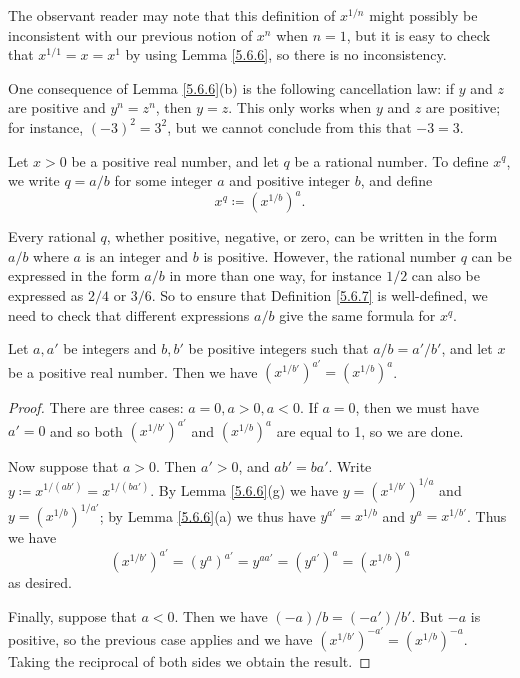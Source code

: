 \begin{note}
The observant reader may note that this definition of \(x^{1 / n}\) might possibly be inconsistent with our previous notion of \(x^n\) when \(n = 1\), but it is easy to check that \(x^{1 / 1} = x = x^1\) by using Lemma \ref{5.6.6}, so there is no inconsistency.
\end{note}

\begin{note}
One consequence of Lemma \ref{5.6.6}(b) is the following cancellation law:
if \(y\) and \(z\) are positive and \(y^n = z^n\), then \(y = z\).
This only works when \(y\) and \(z\) are positive;
for instance, \((-3)^2 = 3^2\), but we cannot conclude from this that \(-3 = 3\).
\end{note}

\begin{definition}\label{5.6.7}
Let \(x > 0\) be a positive real number, and let \(q\) be a rational number.
To define \(x^q\), we write \(q = a / b\) for some integer \(a\) and positive integer \(b\), and define
\[
    x^q \coloneqq (x^{1 / b})^a.
\]
\end{definition}

\begin{note}
Every rational \(q\), whether positive, negative, or zero, can be written in the form \(a / b\) where \(a\) is an integer and \(b\) is positive.
However, the rational number \(q\) can be expressed in the form \(a / b\) in more than one way, for instance \(1 / 2\) can also be expressed as \(2 / 4\) or \(3 / 6\).
So to ensure that Definition \ref{5.6.7} is well-defined, we need to check that different expressions \(a / b\) give the same formula for \(x^q\).
\end{note}

\begin{lemma}\label{5.6.8}
Let \(a, a'\) be integers and \(b, b'\) be positive integers such that \(a / b = a' / b'\), and let \(x\) be a positive real number.
Then we have \((x^{1 / b'})^{a'} = (x^{1 / b})^a\).
\end{lemma}

\begin{proof}
There are three cases: \(a = 0, a > 0, a < 0\).
If \(a = 0\), then we must have \(a' = 0\) and so both \((x^{1 / b'})^{a'}\) and \((x^{1 / b})^a\) are equal to 1, so we are done.

Now suppose that \(a > 0\).
Then \(a' > 0\), and \(ab' = ba'\).
Write \(y \coloneqq x^{1 / (ab')} = x^{1 / (ba')}\).
By Lemma \ref{5.6.6}(g) we have \(y = (x^{1 / b'})^{1 / a}\) and \(y = (x^{1 / b})^{1 / a'}\);
by Lemma \ref{5.6.6}(a) we thus have \(y^{a'} = x^{1 / b}\) and \(y^a = x^{1 / b'}\).
Thus we have
\[
    (x^{1 / b'})^{a'} = (y^a)^{a'} = y^{aa'} = (y^{a'})^a = (x^{1 / b})^a
\]
as desired.

Finally, suppose that \(a < 0\).
Then we have \((-a) / b = (-a') / b'\).
But \(-a\) is positive, so the previous case applies and we have \((x^{1 / b'})^{-a'} = (x^{1 / b})^{-a}\).
Taking the reciprocal of both sides we obtain the result.
\end{proof}

